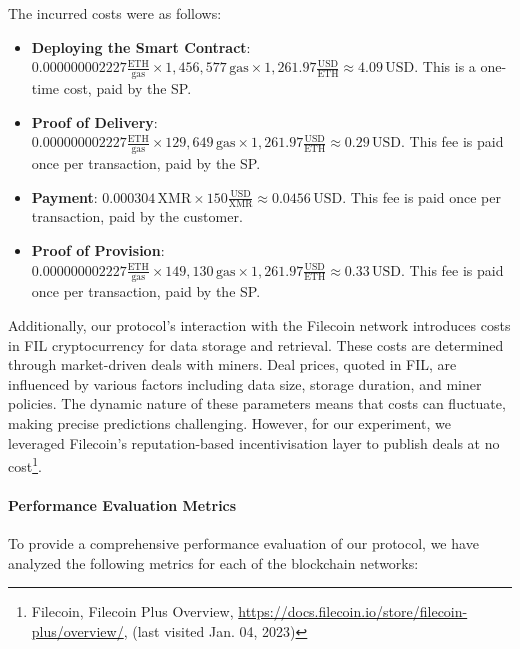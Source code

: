 \documentclass[pdftex,twocolumn,epjc3]{svjour3}
\begin{document}
{The incurred costs were as follows:

\begin{itemize}
    \item \textbf{Deploying the Smart Contract}: \( 0.000000002227 \frac{\text{ETH}}{\text{gas}} \times 1,456,577 \, \text{gas} \times 1,261.97 \frac{\text{USD}}{\text{ETH}} \approx 4.09 \, \text{USD} \). This is a one-time cost, paid by the SP.

    \item \textbf{Proof of Delivery}: \( 0.000000002227 \frac{\text{ETH}}{\text{gas}} \times 129,649 \, \text{gas} \times 1,261.97 \frac{\text{USD}}{\text{ETH}} \approx 0.29 \, \text{USD} \). This fee is paid once per transaction, paid by the SP.

    \item \textbf{Payment}: \( 0.000304 \, \text{XMR} \times 150 \frac{\text{USD}}{\text{XMR}} \approx 0.0456 \, \text{USD} \).  This fee is paid once per transaction, paid by the customer.
        
    \item \textbf{Proof of Provision}: \( 0.000000002227 \frac{\text{ETH}}{\text{gas}} \times 149,130 \, \text{gas} \times 1,261.97 \frac{\text{USD}}{\text{ETH}} \approx 0.33 \, \text{USD} \). This fee is paid once per transaction, paid by the SP.
\end{itemize}

Additionally, our protocol's interaction with the Filecoin network introduces costs in FIL cryptocurrency for data storage and retrieval. These costs are determined through market-driven deals with miners. Deal prices, quoted in FIL, are influenced by various factors including data size, storage duration, and miner policies. The dynamic nature of these parameters means that costs can fluctuate, making precise predictions challenging. However, for our experiment, we leveraged Filecoin's reputation-based incentivisation layer to publish deals at no cost\footnote{Filecoin, Filecoin Plus Overview, \url{https://docs.filecoin.io/store/filecoin-plus/overview/}, (last visited Jan. 04, 2023)}.

\paragraph{Performance Evaluation Metrics}

To provide a comprehensive performance evaluation of our protocol, we have analyzed the following metrics for each of the blockchain networks:

}
\end{document}
